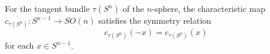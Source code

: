 For the tangent bundle $\tau(S^n)$ of the $n$-sphere, the characteristic map $c_{\tau(S^n)}: S^{n-1} \to SO(n)$ satisfies the symmetry relation
$$c_{\tau(S^n)}(-x) = c_{\tau(S^n)}(x)$$
for each $x \in S^{n-1}$.
